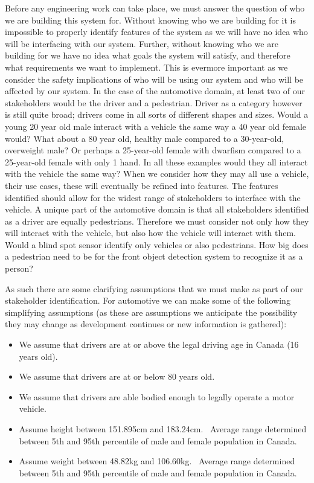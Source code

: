 Before any engineering work can take place, we must answer the question of who we are building this system for. Without knowing who we are building for it is impossible to properly identify features of the system as we will have no idea who will be interfacing with our system. Further, without knowing who we are building for we have no idea what goals the system will satisfy, and therefore what requirements we want to implement. This is evermore important as we consider the safety implications of who will be using our system and who will be affected by our system. In the case of the automotive domain, at least two of our stakeholders would be the driver and a pedestrian. Driver as a category however is still quite broad; drivers come in all sorts of different shapes and sizes. Would a young 20 year old male interact with a vehicle the same way a 40 year old female would? What about a 80 year old, healthy male compared to a 30-year-old, overweight male? Or perhaps a 25-year-old female with dwarfism compared to a 25-year-old female with only 1 hand. In all these examples would they all interact with the vehicle the same way? When we consider how they may all use a vehicle, their use cases, these will eventually be refined into features. The features identified should allow for the widest range of stakeholders to interface with the vehicle. A unique part of the automotive domain is that all stakeholders identified as a driver are equally pedestrians. Therefore we must consider not only how they will interact with the vehicle, but also how the vehicle will interact with them. Would a blind spot sensor identify only vehicles or also pedestrians. How big does a pedestrian need to be for the front object detection system to recognize it as a person? 

As such there are some clarifying assumptions that we must make as part of our stakeholder identification. For automotive we can make some of the following simplifying assumptions (as these are assumptions we anticipate the possibility they may change as development continues or new information is gathered):
\begin{itemize}
	\item We assume that drivers are at or above the legal driving age in Canada (16 years old).
	\item We assume that drivers are at or below 80 years old.
	\item We assume that drivers are able bodied enough to legally operate a motor vehicle.
	\item Assume height between 151.895cm and 183.24cm.~\cite{AgeHeightStats} Average range determined between 5th and 95th percentile of male and female population in Canada.
	\item Assume weight between 48.82kg and 106.60kg.~\cite{AgeWeightStats} Average range determined between 5th and 95th percentile of male and female population in Canada.
\end{itemize}

